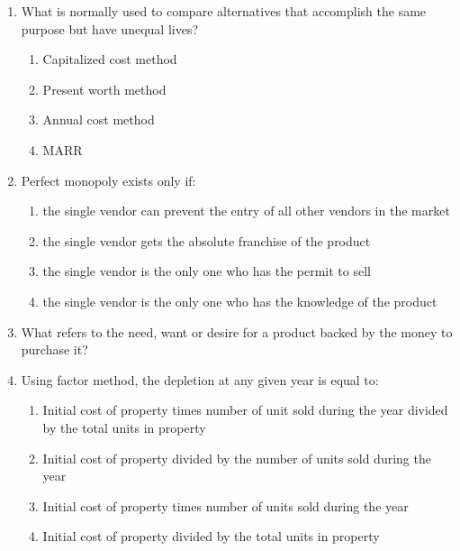 \documentclass[11pt,a4paper]{article}
\begin{document}
\begin{enumerate}
\\
\item{What is normally used to compare alternatives that accomplish the same purpose but have unequal lives?}
\begin{enumerate}[label=\Alph*.]
\item{Capitalized cost method}
\item{Present worth method}
\item{Annual cost method}
\item{MARR}
\end{enumerate}
\item{Perfect monopoly exists only if:}
\begin{enumerate}[label=\Alph*.]
\item{the single vendor can prevent the entry of all other vendors in the market}
\item{the single vendor gets the absolute franchise of the product}
\item{the single vendor is the only one who has the permit to sell}
\item{the single vendor is the only one who has the knowledge of the product}
\end{enumerate}
\item{What refers to the need, want or desire for a product backed by the money to purchase it?}
\\
\item{Using factor method, the depletion at any given year is equal to:}
\begin{enumerate}[label=\Alph*.]
\item{Initial cost of property times number of unit sold during the year divided by the total units in property}
\item{Initial cost of property divided by the number of units sold during the year}
\item{Initial cost of property times number of units sold during the year}
\item{Initial cost of property divided by the total units in property}
\end{enumerate}
\end{enumerate}
\end{document}

